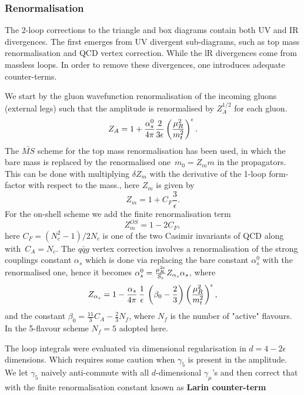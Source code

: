 \subsubsection{Renormalisation}
The 2-loop corrections to the triangle and box diagrams contain both UV and IR divergences. The first emerges from UV divergent sub-diagrams, such as top mass renormalisation and QCD vertex correction. While the lR divergences come from massless loops. In order to remove these divergences, one introduces adequate counter-terms. 
\par  We start by the gluon wavefunction renormalisation of the incoming gluons  (external legs) such that the amplitude is renormalised by $ Z_A^{1/2}$ for each gluon.
\begin{equation}
	Z_A= 1+\frac{\alpha_s^0}{4 \pi} \frac{2}{3\epsilon} \left( \frac{\mu_R^2}{m_t^2} \right) ^\epsilon.
\end{equation}
 The $\bar{MS}$ scheme for the top mass renormalisation has been used, in which the bare mass is replaced by the renormalised one~$ m_0 = Z_m m$  in the propagators. This can be done with multiplying $ \delta Z_m$ with the derivative of the 1-loop form-factor with respect to the  mass., here $Z_m$ is given by
\begin{equation}
	Z_m = 1+ C_F \frac{3}{\epsilon}.
\end{equation}
For the on-shell scheme we add the finite renormalisation term
\begin{equation}
	Z^{OS}_m = 1- 2 C_F,
\end{equation}
here $C_F=(N_c^2-1)/2N_c$ is one of the two Casimir invariants of QCD along with~$ C_A=N_c$. 
The $q \bar q g$ vertex correction involves a renormalisation of the strong couplings constant $ \alpha_s$ which is done via replacing the bare constant $\alpha_s^0$ with the renormalised one, hence it becomes  $ \alpha^0_s = \frac{\mu_R^{2\epsilon}}{S_\epsilon}  Z_{\alpha_s} \alpha_s$, where
\begin{equation}
	Z_{\alpha_s} = 1- \frac{\alpha_s}{4 \pi} \, \frac{1}{ \epsilon}\,  \left( \beta_0-\frac{2}{3} \right) \left(\frac{\mu_R^2}{m_t^2} \right) ^\epsilon,
\end{equation}
and the constant $ \beta_0 = \frac{11}{3} C_A -\frac{2}{3}N_f$, where $N_f$ is the number of "active" flavours. In the 5-flavour scheme $N_f=5$ adopted here. 
\par The loop integrals were evaluated via dimensional regularisation in $d= 4-2\epsilon$ dimensions. Which requires some caution when $\gamma_5$ is present in the amplitude. We let $\gamma_5$ naively anti-commute with all $d$-dimensional $\gamma_\mu$'s and then correct that with the finite renormalisation constant known as \textbf{ Larin counter-term}~\cite{Larin:1993tq}
